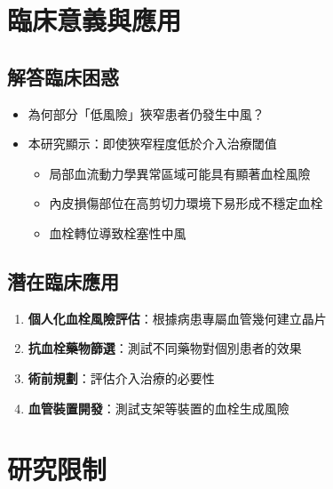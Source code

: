 \documentclass[12pt,a4paper]{article}
\begin{document}
\section{臨床意義與應用}

\subsection{解答臨床困惑}

\begin{itemize}
    \item 為何部分「低風險」狹窄患者仍發生中風？
    \item 本研究顯示：即使狹窄程度低於介入治療閾值
    \begin{itemize}
        \item 局部血流動力學異常區域可能具有顯著血栓風險
        \item 內皮損傷部位在高剪切力環境下易形成不穩定血栓
        \item 血栓轉位導致栓塞性中風
    \end{itemize}
\end{itemize}

\subsection{潛在臨床應用}

\begin{enumerate}
    \item \textbf{個人化血栓風險評估}：根據病患專屬血管幾何建立晶片
    \item \textbf{抗血栓藥物篩選}：測試不同藥物對個別患者的效果
    \item \textbf{術前規劃}：評估介入治療的必要性
    \item \textbf{血管裝置開發}：測試支架等裝置的血栓生成風險
\end{enumerate}

\section{研究限制}
\end{document}
